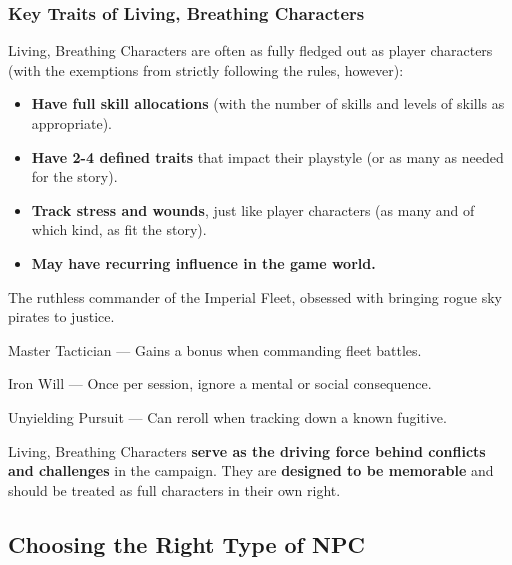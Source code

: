 \subsubsection{Key Traits of Living, Breathing Characters}
Living, Breathing Characters are often as fully fledged out as player characters (with the exemptions from strictly following the rules, however):
\begin{itemize}
    \item \textbf{Have full skill allocations} (with the number of skills and levels of skills as appropriate).
    \item \textbf{Have 2-4 defined traits} that impact their playstyle (or as many as needed for the story).
    \item \textbf{Track stress and wounds}, just like player characters (as many and of which kind, as fit the story).
    \item \textbf{May have recurring influence in the game world.}
\end{itemize}

\begin{WyrdExample}
	The ruthless commander of the Imperial Fleet, obsessed with bringing rogue sky pirates to justice.
  
	\vspace{0.5\baselineskip}
	\SkillsBox[%
	  superior={Strategy},%
	  expert={Navigation},%
	  skilled={Command, Combat},%
	  novice={Resources, Deception, Awareness}%
	]
  
	\begin{TraitsBox}
	  \item[Master Tactician] — Gains a bonus when commanding fleet battles.
	  \item[Iron Will] — Once per session, ignore a mental or social consequence.
	  \item[Unyielding Pursuit] — Can reroll when tracking down a known fugitive.
	\end{TraitsBox}
  
	\DamageBox
  \end{WyrdExample}
  

Living, Breathing Characters \textbf{serve as the driving force behind conflicts and challenges} in the campaign. They are \textbf{designed to be memorable} and should be treated as full characters in their own right.

\subsection{Choosing the Right Type of NPC}

